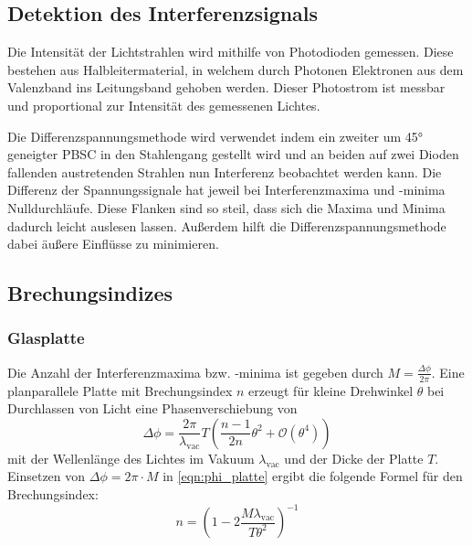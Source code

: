     \subsection{Detektion des Interferenzsignals}
        Die Intensität der Lichtstrahlen wird mithilfe von Photodioden gemessen. Diese bestehen aus Halbleitermaterial, in welchem durch Photonen Elektronen aus dem Valenzband ins Leitungsband gehoben werden. Dieser Photostrom ist messbar und proportional zur Intensität des gemessenen Lichtes.

        Die Differenzspannungsmethode wird verwendet indem ein zweiter um 45° geneigter PBSC in den Stahlengang gestellt wird und an beiden auf zwei Dioden fallenden austretenden Strahlen nun Interferenz beobachtet werden kann.
        Die Differenz der Spannungssignale hat jeweil bei Interferenzmaxima und -minima Nulldurchläufe.
        Diese Flanken sind so steil, dass sich die Maxima und Minima dadurch leicht auslesen lassen.
        Außerdem hilft die Differenzspannungsmethode dabei äußere Einflüsse zu minimieren.

    \subsection{Brechungsindizes}
        \subsubsection{Glasplatte}
            Die Anzahl der Interferenzmaxima bzw. -minima ist gegeben durch $M = \frac{\Delta \phi}{2 \pi}$. Eine planparallele Platte mit Brechungsindex $n$ erzeugt für kleine Drehwinkel $\theta$ bei Durchlassen von Licht eine Phasenverschiebung von
            \begin{equation}
                \Delta \phi = \frac{2\pi}{\lambda_{\text{vac}}} T \left(\frac{n - 1}{2n} \theta^2 + \mathcal{O}\left(\theta^4\right)\right)
                \label{eqn:phi_platte}
            \end{equation}
            mit der Wellenlänge des Lichtes im Vakuum $\lambda_{\text{vac}}$ und der Dicke der Platte $T$. \cite{tu_dortmund_versuchsanleitung_2021-1}\\
            Einsetzen von $\Delta \phi = 2\pi \cdot M$ in \eqref{eqn:phi_platte} ergibt die folgende Formel für den Brechungsindex:
            \begin{equation}
                n = \left(1 - 2\frac{M \lambda_{\text{vac}}}{T \theta^2}\right)^{-1}
                \label{eqn:n_platte}
            \end{equation}

